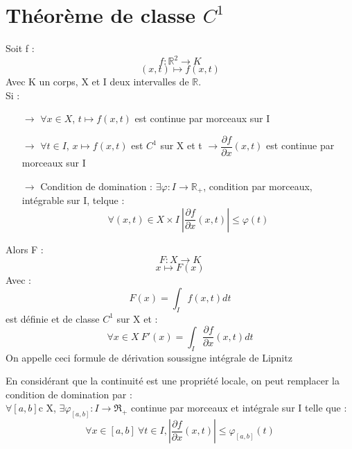 \section{Théorème de classe $C^1$}
\begin{theo}
Soit f : 
$$f : \mathbb{R}^2 \rightarrow K$$
$$(x,t) \mapsto f(x,t)$$
Avec K un corps, X et I deux intervalles de $\mathbb{R}$.\\
Si : 
\begin{itemize}
 \item[$\rightarrow$] $\forall x \in X$, $t \mapsto f(x,t)$ est continue par morceaux sur I
 \item[$\rightarrow$] $\forall t \in I$, $x \mapsto f(x,t)$ est $C^1$ sur X et t $\rightarrow \dfrac{\partial f}{\partial x}(x,t)$ est continue par morceaux sur I
 \item[$\rightarrow$] Condition de domination : $\exists \varphi : I \rightarrow \mathbb{R}_+$, condition par morceaux, intégrable sur I, telque :
$$\forall (x,t) \in X \times I~ |\dfrac{\partial f}{\partial x}(x,t)| \leq \varphi(t)$$
\end{itemize}
Alors F : 
$$F : X \rightarrow K$$
$$x \mapsto F(x) $$
Avec : 
$$F(x) = \int_I f(x,t) dt$$
est définie et de classe $C^1$ sur X et :
$$\forall x \in X~ F'(x) = \int_I \dfrac{\partial f}{\partial x} (x,t) dt$$
On appelle ceci formule de dérivation soussigne intégrale de Lipnitz
\end{theo}
\begin{prop}
En considérant que la continuité est une propriété locale, on peut remplacer la condition de domination par : \\
$\forall [a,b] $c X, $\exists \varphi_{[a,b]} : I \rightarrow \Re_+$ continue par morceaux et intégrale sur I telle que : 
$$\forall x \in [a,b]~ \forall t \in I, |\dfrac{\partial f}{\partial x}(x,t)|\leq \varphi_{[a,b]}(t)$$
\end{prop}
